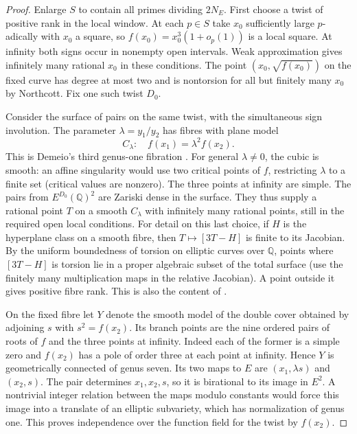 \documentclass[11pt]{article}
\newcommand{\Q}{\mathbb Q}\newcommand{\F}{\mathbb F}\newcommand{\Z}{\mathbb Z}
\begin{document}
\begin{proof}
Enlarge $S$ to contain all primes dividing $2N_E$. First choose a twist of positive rank in the local window. At each $p\in S$ take $x_0$ sufficiently large $p$-adically with $x_0$ a square, so $f(x_0)=x_0^3(1+o_p(1))$ is a local square. At infinity both signs occur in nonempty open intervals. Weak approximation gives infinitely many rational $x_0$ in these conditions. The point $(x_0,\sqrt{f(x_0)})$ on the fixed curve has degree at most two and is nontorsion for all but finitely many $x_0$ by Northcott. Fix one such twist $D_0$.

Consider the surface of pairs on the same twist, with the simultaneous sign involution. The parameter $\lambda=y_1/y_2$ has fibres with plane model
\[
 C_\lambda:\quad f(x_1)=\lambda^2 f(x_2).
\]
This is Demeio's third genus-one fibration \cite[\S4.2]{demeio}. For general $\lambda\ne0$, the cubic is smooth: an affine singularity would use two critical points of $f$, restricting $\lambda$ to a finite set (critical values are nonzero). The three points at infinity are simple. The pairs from $E^{D_0}(\Q)^2$ are Zariski dense in the surface. They thus supply a rational point $T$ on a smooth $C_\lambda$ with infinitely many rational points, still in the required open local conditions. For detail on this last choice, if $H$ is the hyperplane class on a smooth fibre, then $T\mapsto[3T-H]$ is finite to its Jacobian. By the uniform boundedness of torsion on elliptic curves over $\Q$, points where $[3T-H]$ is torsion lie in a proper algebraic subset of the total surface (use the finitely many multiplication maps in the relative Jacobian). A point outside it gives positive fibre rank. This is also the content of \cite[Lemma~3.2]{demeio}.

On the fixed fibre let $Y$ denote the smooth model of the double cover obtained by adjoining $s$ with $s^2=f(x_2)$. Its branch points are the nine ordered pairs of roots of $f$ and the three points at infinity. Indeed each of the former is a simple zero and $f(x_2)$ has a pole of order three at each point at infinity. Hence $Y$ is geometrically connected of genus seven. Its two maps to $E$ are $(x_1,\lambda s)$ and $(x_2,s)$. The pair determines $x_1,x_2,s$, so it is birational to its image in $E^2$. A nontrivial integer relation between the maps modulo constants would force this image into a translate of an elliptic subvariety, which has normalization of genus one. This proves independence over the function field for the twist by $f(x_2)$.


\end{proof}
\end{document}
